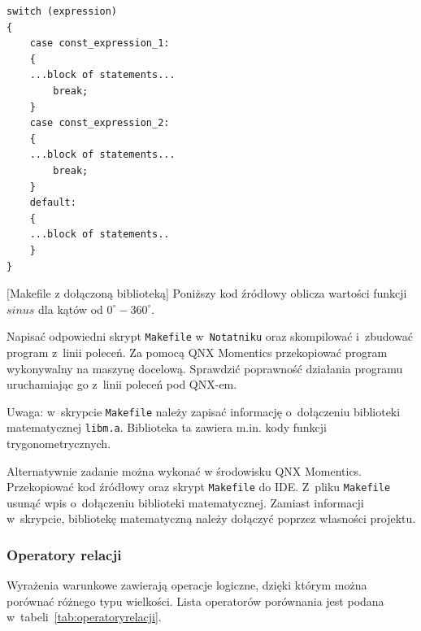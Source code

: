 \begin{lstlisting}[style=MyCStyle]
switch (expression)
{
	case const_expression_1:
	{
	...block of statements...
		break;
	}
	case const_expression_2:
	{
	...block of statements...
		break;
	}
	default:
	{
	...block of statements..
	}
}
\end{lstlisting}



\begin{example}{[Makefile z dołączoną biblioteką]}
Poniższy kod źródłowy oblicza wartości funkcji $sinus$ dla kątów od $0^{\circ}-360^{\circ}$. 





\begin{myenumerate}
\item Napisać odpowiedni skrypt \lstinline[style=MyCStyle]{Makefile} w~\lstinline[style=MyCStyle]{Notatniku} oraz skompilować i~zbudować program z~linii poleceń. Za pomocą QNX Momentics przekopiować program wykonywalny na maszynę docelową. Sprawdzić poprawność działania programu uruchamiając go z~linii poleceń pod QNX-em. 

Uwaga: w~skrypcie \lstinline[style=MyCStyle]{Makefile} należy zapisać informację o~dołączeniu biblioteki matematycznej \mbox{\lstinline[style=MyCStyle]{libm.a}}. Biblioteka ta zawiera m.in. kody funkcji trygonometrycznych. 
\item  Alternatywnie zadanie można wykonać w środowisku QNX Momentics. Przekopiować kod źródłowy oraz skrypt \lstinline[style=MyCStyle]{Makefile} do IDE. Z~pliku \lstinline[style=MyCStyle]{Makefile} usunąć wpis o~dołączeniu biblioteki matematycznej. Zamiast informacji w~skrypcie, bibliotekę matematyczną należy dołączyć poprzez własności projektu. 
\end{myenumerate} 

\end{example} 


\subsubsection{Operatory relacji}

Wyrażenia warunkowe zawierają operacje logiczne, dzięki którym można porównać różnego typu wielkości. Lista operatorów porównania jest podana w~tabeli~\ref{tab:operatoryrelacji}. 

